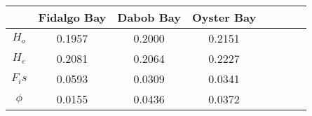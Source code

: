 \documentclass[fleqn,10pt]{wlscirep}
\begin{document}
\begin{tabular}{SSSSSSSS}\toprule
    { } & {Fidalgo Bay} & {Dabob Bay} & {Oyster Bay} \\ \midrule
    {$H_o$} & 0.1957    & 0.2000 & 0.2151 \\ 
    {$H_e$} & {0.2081} & {0.2064} & 0.2227 \\
    {$F_is$} & 0.0593 & 0.0309 & 0.0341\\
    {$\phi$} & 0.0155 & 0.0436 & 0.0372 \\ \bottomrule
\end{tabular}
\end{document}

